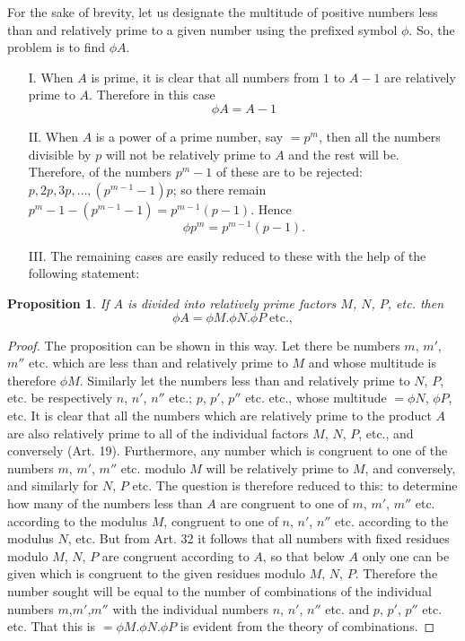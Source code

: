 \documentclass{book}
\theoremstyle{plain}
\newtheorem{proposition}{Proposition}
\theoremstyle{remark}
\begin{document}
For the sake of brevity, let us designate the multitude of positive numbers less than and relatively prime to a given number using the prefixed symbol $\phi$.  So, the problem is to find $\phi A$.
\begin{itemize}
\item[I.] When $A$ is prime, it is clear that all numbers from $1$ to $A-1$ are relatively prime to $A$.  Therefore in this case 
\[ \phi A = A-1 \]
\item[II.] When $A$ is a power of a prime number, say $=p^m$, then all the numbers divisible by $p$ will not be relatively prime to $A$ and the rest will be.  Therefore, of the numbers $p^m-1$ of these are to be rejected: $p, 2p, 3p, \dots, (p^{m-1}-1)p$; so there remain $p^m-1-(p^{m-1}-1) = p^{m-1}(p-1)$.   Hence
\[ \phi p^m = p^{m-1}(p-1). \]
\item[III.]  The remaining cases are easily reduced to these with the help of the following statement: 
\end{itemize}
\begin{proposition} If $A$ is divided into relatively prime factors $M$, $N$, $P$, etc. then
\[ \phi A = \phi M . \phi N . \phi P \; \textrm{etc.}, \]
\end{proposition}
\begin{proof} The proposition can be shown in this way.  Let there be numbers $m$, $m'$, $m''$ etc. which are less than and relatively prime to $M$ and whose multitude is therefore $\phi M$.  Similarly let the numbers less than and relatively prime to $N$, $P$, etc. be respectively $n$, $n'$, $n''$ etc.; $p$, $p'$, $p''$ etc. etc., whose multitude $=\phi N$, $\phi P$, etc.  It is clear that all the numbers which are relatively prime to the product $A$ are also relatively prime to all of the individual factors $M$, $N$, $P$, etc., and conversely (Art. 19).    Furthermore, any number which is congruent to one of the numbers $m$, $m'$, $m''$ etc. modulo $M$ will be relatively prime to $M$, and conversely, and similarly for $N$, $P$ etc.   The question is therefore reduced to this: to determine how many of the numbers less than $A$ are congruent to one of $m$, $m'$, $m''$ etc. according to the modulus $M$, congruent to one of $n$, $n'$, $n''$ etc. according to the modulus $N$, etc.   But from Art. 32 it follows that all numbers with fixed residues modulo $M$, $N$, $P$ are congruent according to $A$, so that below $A$ only one can be given which is congruent to the given residues modulo $M$, $N$, $P$.  Therefore the number sought will be equal to the number of combinations of the individual numbers $m$,$m'$,$m''$ with the individual numbers $n$, $n'$, $n''$ etc. and $p$, $p'$, $p''$ etc. etc.  That this is $=\phi M.\phi N.\phi P$ is evident from the theory of combinations. \end{proof}
\end{document}

